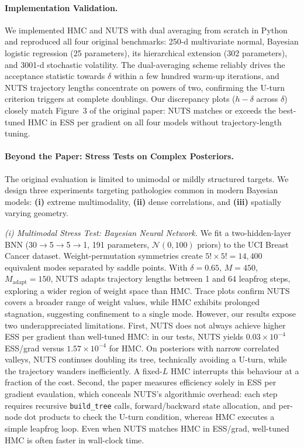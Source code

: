\documentclass{article}
\begin{document}
\paragraph{Implementation Validation.}
We implemented HMC and NUTS with dual averaging from scratch in Python and reproduced all four original benchmarks: 250-d multivariate normal, Bayesian logistic regression (25 parameters), its hierarchical extension (302 parameters), and 3001-d stochastic volatility. The dual-averaging scheme reliably drives the acceptance statistic towards $\delta$ within a few hundred warm-up iterations, and NUTS trajectory lengths concentrate on powers of two, confirming the U-turn criterion triggers at complete doublings. Our discrepancy plots ($h - \delta$ across $\delta$) closely match Figure~3 of the original paper: NUTS matches or exceeds the best-tuned HMC in ESS per gradient on all four models without trajectory-length tuning.

\paragraph{Beyond the Paper: Stress Tests on Complex Posteriors.}
The original evaluation is limited to unimodal or mildly structured targets. We design three experiments targeting pathologies common in modern Bayesian models: \textbf{(i)} extreme multimodality, \textbf{(ii)} dense correlations, and \textbf{(iii)} spatially varying geometry.

\vspace{0.05cm}
\noindent\textit{(i) Multimodal Stress Test: Bayesian Neural Network.}
We fit a two-hidden-layer BNN (30$\to$5$\to$5$\to$1, 191 parameters, $\mathcal{N}(0,100)$ priors) to the UCI Breast Cancer dataset. Weight-permutation symmetries create $5!\times5!=14{,}400$ equivalent modes separated by saddle points. With $\delta=0.65$, $M=450$, $M_{\text{adapt}}=150$, NUTS adapts trajectory lengths between 1 and 64 leapfrog steps, exploring a wider region of weight space than HMC. Trace plots confirm NUTS covers a broader range of weight values, while HMC exhibits prolonged stagnation, suggesting confinement to a single mode. However, our results expose two underappreciated limitations. First, NUTS does not always achieve higher ESS per gradient than well-tuned HMC: in our tests, NUTS yields $0.03\times 10^{-4}$ ESS/grad versus $1.57\times 10^{-4}$ for HMC. On posteriors with narrow correlated valleys, NUTS continues doubling its tree, technically avoiding a U-turn, while the trajectory wanders inefficiently. A fixed-$L$ HMC interrupts this behaviour at a fraction of the cost. Second, the paper measures efficiency solely in ESS per gradient evaulation, which conceals NUTS's algorithmic overhead: each step requires recursive \texttt{build\_tree} calls, forward/backward state allocation, and per-node dot products to check the U-turn condition, whereas HMC executes a simple leapfrog loop. Even when NUTS matches HMC in ESS/grad, well-tuned HMC is often faster in wall-clock time.
\end{document}
